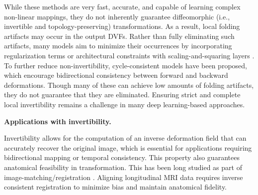 \documentclass[lettersize,journal]{IEEEtran}
\begin{document}
While these methods are very fast, accurate, and capable of learning complex non-linear mappings, they do not inherently guarantee diffeomorphic (i.e., invertible and topology-preserving) transformations. As a result, local folding artifacts may occur in the output DVFs. Rather than fully eliminating such artifacts, many models aim to minimize their occurrences by incorporating regularization terms or architectural constraints with scaling-and-squaring layers \cite{Dalca2018}. To further reduce non-invertibility, cycle-consistent models \cite{KIM2021CycleMorph, Huang2023} have been proposed, which encourage bidirectional consistency between forward and backward deformations. Though many of these can achieve low amounts of folding artifacts, they do not guarantee that they are eliminated. Ensuring strict and complete local invertibility remains a challenge in many deep learning-based approaches.

\textbf{Applications with invertibility.}

Invertibility allows for the computation of an inverse deformation field that can accurately recover the original image, which is essential for applications requiring bidirectional mapping or temporal consistency. This property also guarantees anatomical feasibility in transformation. This has been long studied as part of image-matching/registration \cite{Dupuis1998}. Aligning longitudinal MRI data \cite{REUTER20101181} requires inverse consistent registration to minimize bias and maintain anatomical fidelity.
\end{document}
